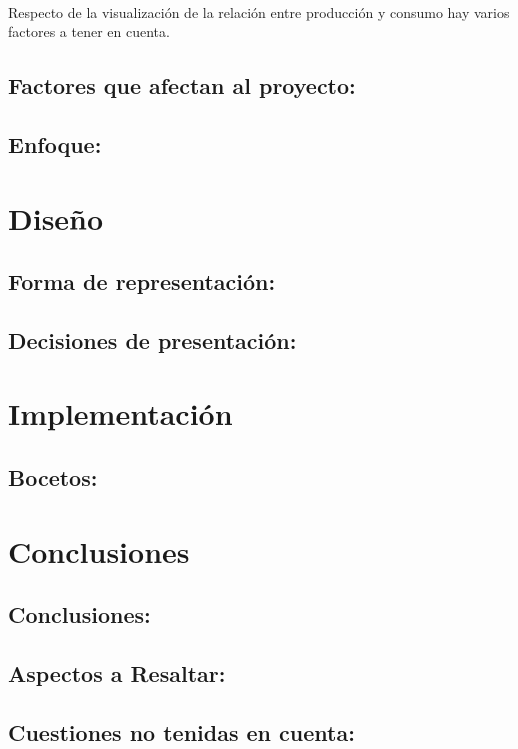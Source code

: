 \documentclass{article}
\begin{document}
			\paragraph{}
			Respecto de la visualización de la relación entre producción y consumo hay varios factores a tener en cuenta. 
			

		\subsection{Factores que afectan al proyecto:}
		

		\subsection{Enfoque:}


	\section{Diseño}		
	
		\subsection{Forma de representación:}
		
	
		\subsection{Decisiones de presentación:}


	\section{Implementación}

		\subsection{Bocetos:}

	
	\section{Conclusiones}
	
		\subsection{Conclusiones:}
	
	
		\subsection{Aspectos a Resaltar:}
	
	
		\subsection{Cuestiones no tenidas en cuenta:}
\end{document}
